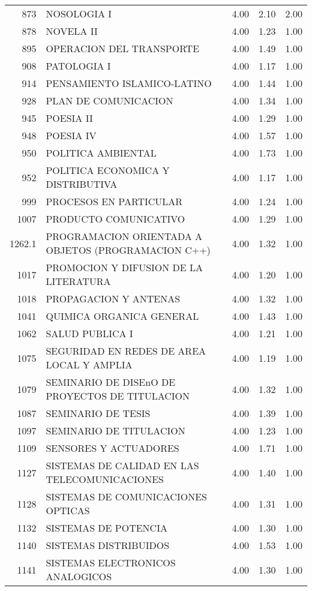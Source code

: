 \documentclass[12pt]{article}
\begin{document}
\begin{table}[ht]
\begin{tabular}{rlrrr}
  873 & NOSOLOGIA I & 4.00 & 2.10 & 2.00 \\ 
  878 & NOVELA II & 4.00 & 1.23 & 1.00 \\ 
  895 & OPERACION DEL TRANSPORTE & 4.00 & 1.49 & 1.00 \\ 
  908 & PATOLOGIA I & 4.00 & 1.17 & 1.00 \\ 
  914 & PENSAMIENTO ISLAMICO-LATINO & 4.00 & 1.44 & 1.00 \\ 
  928 & PLAN DE COMUNICACION & 4.00 & 1.34 & 1.00 \\ 
  945 & POESIA II & 4.00 & 1.29 & 1.00 \\ 
  948 & POESIA IV & 4.00 & 1.57 & 1.00 \\ 
  950 & POLITICA AMBIENTAL & 4.00 & 1.73 & 1.00 \\ 
  952 & POLITICA ECONOMICA Y DISTRIBUTIVA & 4.00 & 1.17 & 1.00 \\ 
  999 & PROCESOS EN PARTICULAR & 4.00 & 1.24 & 1.00 \\ 
  1007 & PRODUCTO COMUNICATIVO & 4.00 & 1.29 & 1.00 \\ 
  1262.1 & PROGRAMACION ORIENTADA A OBJETOS (PROGRAMACION C++) & 4.00 & 1.32 & 1.00 \\ 
  1017 & PROMOCION Y DIFUSION DE LA LITERATURA & 4.00 & 1.20 & 1.00 \\ 
  1018 & PROPAGACION Y ANTENAS & 4.00 & 1.32 & 1.00 \\ 
  1041 & QUIMICA ORGANICA GENERAL & 4.00 & 1.43 & 1.00 \\ 
  1062 & SALUD PUBLICA I & 4.00 & 1.21 & 1.00 \\ 
  1075 & SEGURIDAD EN REDES DE AREA LOCAL Y AMPLIA & 4.00 & 1.19 & 1.00 \\ 
  1079 & SEMINARIO DE DISEnO DE PROYECTOS DE TITULACION & 4.00 & 1.32 & 1.00 \\ 
  1087 & SEMINARIO DE TESIS & 4.00 & 1.39 & 1.00 \\ 
  1097 & SEMINARIO DE TITULACION & 4.00 & 1.23 & 1.00 \\ 
  1109 & SENSORES Y ACTUADORES & 4.00 & 1.71 & 1.00 \\ 
  1127 & SISTEMAS DE CALIDAD EN LAS TELECOMUNICACIONES & 4.00 & 1.40 & 1.00 \\ 
  1128 & SISTEMAS DE COMUNICACIONES OPTICAS & 4.00 & 1.31 & 1.00 \\ 
  1132 & SISTEMAS DE POTENCIA & 4.00 & 1.30 & 1.00 \\ 
  1140 & SISTEMAS DISTRIBUIDOS & 4.00 & 1.53 & 1.00 \\ 
  1141 & SISTEMAS ELECTRONICOS ANALOGICOS & 4.00 & 1.30 & 1.00 \\ 

\end{tabular}
\end{table}
\end{document}
